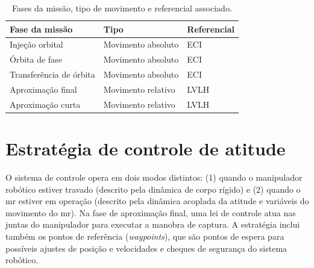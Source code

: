 \begin{table}[H]
\centering
\caption{Fases da missão, tipo de movimento e referencial associado.}
\label{tab:fases_missao_referenciais}
\begin{tabular}{lll}
\hline
\textbf{Fase da missão} & \textbf{Tipo} & \textbf{Referencial} \\
\hline
Injeção orbital         & Movimento absoluto & ECI \\
Órbita de fase          & Movimento absoluto & ECI \\
Transferência de órbita & Movimento absoluto & ECI \\
Aproximação final & Movimento relativo & LVLH \\
Aproximação curta & Movimento relativo & LVLH \\
\hline
\end{tabular}
\end{table}



\section{Estratégia de controle de atitude}
\label{sec:controle_atitude}

O sistema de controle opera em dois modos distintos:
(1) quando o manipulador robótico estiver travado (descrito pela dinâmica de corpo rígido) e
(2) quando o \gls{mr} estiver em operação (descrito pela dinâmica acoplada da atitude e variáveis do movimento do \gls{mr}).
Na fase de aproximação final, uma lei de controle atua nas juntas do manipulador para executar a manobra de captura.
A estratégia inclui também os pontos de referência (\emph{waypoints}), que são pontos de espera para possíveis ajustes de posição e velocidades e cheques de segurança do sistema robótico.

